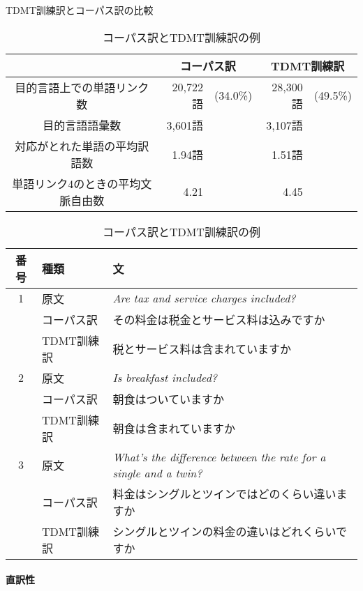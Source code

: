 \begin{table}
\begin{center}
\caption{TDMT訓練訳とコーパス訳の比較}
\label{tbl-corpus-comparison}
{
\smalltable
\begin{tabular}{c|r@{ }lr@{ }l}
\hline\hline
& \multicolumn{2}{|c}{コーパス訳} 
& \multicolumn{2}{c}{TDMT訓練訳} \\
\hline		                              

目的言語上での単語リンク数
& 20,722語 & (34.0\%) 
& 28,300語 & (49.5\%) \\

目的言語語彙数
& 3,601語 & 
& 3,107語 & \\

対応がとれた単語の平均訳語数 
& 1.94語 & 
& 1.51語 & \\

単語リンク4のときの平均文脈自由数 
& 4.21 & 
& 4.45 & \\
\hline\hline
\end{tabular}
}

\vspace*{1.5em}
\caption{コーパス訳とTDMT訓練訳の例}
\label{tbl-tdmt-ideal-example}
{
\smalltable
\begin{tabular}{c|l|l}
\hline\hline
番号 & 種類 & 文 \\
\hline
1 & 原文       & {\it Are tax and service charges included?} \\
  & コーパス訳 & その料金は税金とサービス料は込みですか \\
  & TDMT訓練訳 & 税とサービス料は含まれていますか \\
\hline
2 & 原文       & {\it Is breakfast included?} \\
  & コーパス訳 & 朝食はついていますか \\
  & TDMT訓練訳 & 朝食は含まれていますか \\
\hline
3 & 原文       & {\it What's the difference between the rate for a single and a twin?} \\
  & コーパス訳 & 料金はシングルとツインではどのくらい違いますか \\
  & TDMT訓練訳 & シングルとツインの料金の違いはどれくらいですか \\
\hline\hline
\end{tabular}
}
\end{center}
\end{table}


\paragraph{直訳性}

